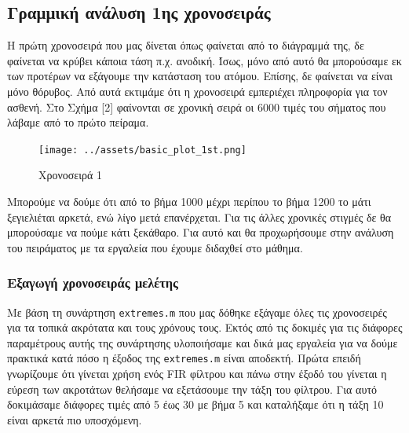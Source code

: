 \documentclass[11pt,]{article}
\begin{document}
\hypertarget{ux3b3ux3c1ux3b1ux3bcux3bcux3b9ux3baux3ae-ux3b1ux3bdux3acux3bbux3c5ux3c3ux3b7-1ux3b7ux3c2-ux3c7ux3c1ux3bfux3bdux3bfux3c3ux3b5ux3b9ux3c1ux3acux3c2}{%
\subsection{Γραμμική ανάλυση 1ης
χρονοσειράς}\label{ux3b3ux3c1ux3b1ux3bcux3bcux3b9ux3baux3ae-ux3b1ux3bdux3acux3bbux3c5ux3c3ux3b7-1ux3b7ux3c2-ux3c7ux3c1ux3bfux3bdux3bfux3c3ux3b5ux3b9ux3c1ux3acux3c2}}

Η πρώτη χρονοσειρά που μας δίνεται όπως φαίνεται από το διάγραμμά της,
δε φαίνεται να κρύβει κάποια τάση π.χ. ανοδική. Ίσως, μόνο από αυτό θα
μπορούσαμε εκ των προτέρων να εξάγουμε την κατάσταση του ατόμου. Επίσης,
δε φαίνεται να είναι μόνο θόρυβος. Από αυτά εκτιμάμε ότι η χρονοσειρά
εμπεριέχει πληροφορία για τον ασθενή. Στο Σχήμα {[}2{]} φαίνονται σε
χρονική σειρά οι 6000 τιμές του σήματος που λάβαμε από το πρώτο πείραμα.

\begin{figure}
\centering
\texttt{[image: ../assets/basic\_plot\_1st.png]}
\caption{Χρονοσειρά 1}
\end{figure}

Μπορούμε να δούμε ότι από το βήμα 1000 μέχρι περίπου το βήμα 1200 το
μάτι ξεγιελιέται αρκετά, ενώ λίγο μετά επανέρχεται. Για τις άλλες
χρονικές στιγμές δε θα μπορούσαμε να πούμε κάτι ξεκάθαρο. Για αυτό και
θα προχωρήσουμε στην ανάλυση του πειράματος με τα εργαλεία που έχουμε
διδαχθεί στο μάθημα.

\hypertarget{ux3b5ux3beux3b1ux3b3ux3c9ux3b3ux3ae-ux3c7ux3c1ux3bfux3bdux3bfux3c3ux3b5ux3b9ux3c1ux3acux3c2-ux3bcux3b5ux3bbux3adux3c4ux3b7ux3c2}{%
\subsubsection{Εξαγωγή χρονοσειράς
μελέτης}\label{ux3b5ux3beux3b1ux3b3ux3c9ux3b3ux3ae-ux3c7ux3c1ux3bfux3bdux3bfux3c3ux3b5ux3b9ux3c1ux3acux3c2-ux3bcux3b5ux3bbux3adux3c4ux3b7ux3c2}}

Με βάση τη συνάρτηση \texttt{extremes.m} που μας δόθηκε εξάγαμε όλες τις
χρονοσειρές για τα τοπικά ακρότατα και τους χρόνους τους. Εκτός από τις
δοκιμές για τις διάφορες παραμέτρους αυτής της συνάρτησης υλοποιήσαμε
και δικά μας εργαλεία για να δούμε πρακτικά κατά πόσο η έξοδος της
\texttt{extremes.m} είναι αποδεκτή. Πρώτα επειδή γνωρίζουμε ότι γίνεται
χρήση ενός FIR φίλτρου και πάνω στην έξοδό του γίνεται η εύρεση των
ακροτάτων θελήσαμε να εξετάσουμε την τάξη του φίλτρου. Για αυτό
δοκιμάσαμε διάφορες τιμές από 5 έως 30 με βήμα 5 και καταλήξαμε ότι η
τάξη 10 είναι αρκετά πιο υποσχόμενη.
\end{document}

